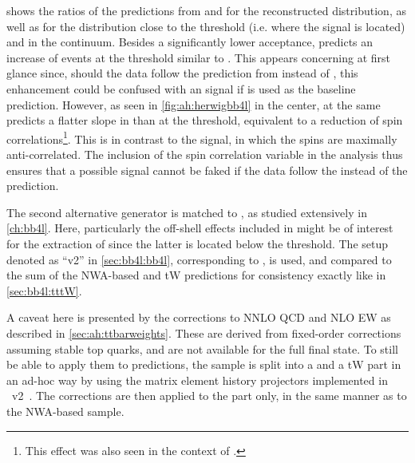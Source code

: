  shows the ratios of the predictions from \herwig and \pythia for the reconstructed \mtt distribution, as well as for the \chel distribution close to the \ttbar threshold (i.e. where the \etat signal is located) and in the \ttbar continuum. Besides a significantly lower \ttbar acceptance, \herwig predicts an increase of events at the \ttbar threshold similar to \etat.
This appears concerning at first glance since, should the data follow the prediction from \herwig instead of \pythia, this enhancement could be confused with an \etat signal if \pythia is used as the baseline prediction.
However, as seen in \cref{fig:ah:herwigbb4l} in the center, \herwig at the same predicts a flatter slope in \chel than \pythia at the \ttbar threshold, equivalent to a reduction of \ttbar spin correlations\footnote{This effect was also seen in the context of .}. This is in contrast to the \etat signal, in which the \ttbar spins are maximally anti-correlated. The inclusion of the spin correlation variable \chel in the analysis thus ensures that a possible signal cannot be faked if the data follow the \herwig instead of the \pythia prediction.

The second alternative generator is \bbfourl matched to \pythia, as studied extensively in \cref{ch:bb4l}. Here, particularly the off-shell effects included in \bbfourl might be of interest for the extraction of \etat since the latter is located below the \ttbar threshold. The setup denoted as ``\bbfourl v2'' in \cref{sec:bb4l:bb4l}, corresponding to , is used, and compared to the sum of the NWA-based \powheg \ttbar and tW predictions for consistency exactly like in \cref{sec:bb4l:tttW}.

A caveat here is presented by the corrections to NNLO QCD and NLO EW as described in \cref{sec:ah:ttbarweights}. These are derived from fixed-order corrections assuming stable top quarks, and are not available for the full \bbllnunu final state. To still be able to apply them to \bbfourl predictions, the \bbfourl sample is split into a \ttbar and a tW part in an ad-hoc way by using the matrix element history projectors implemented in \bbfourl~v2~\cite{Jezo:2023rht}. The corrections are then applied to the \ttbar part only, in the same manner as to the NWA-based \powheg \ttbar sample.


